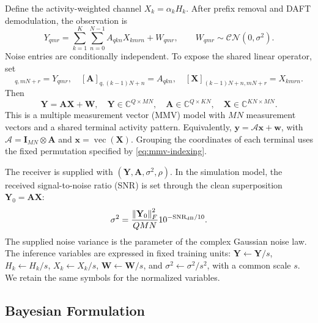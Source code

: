 \documentclass[10pt,a4paper]{article}
\newcommand{\CN}{\mathcal{CN}}
\newcommand{\I}{\mathbf{I}}
\newcommand{\vect}{\operatorname{vec}}
\newcommand{\norm}[1]{\left\lVert#1\right\rVert}
\begin{document}
Define the activity-weighted channel $X_k=\alpha_kH_k$. After prefix
removal and DAFT demodulation, the observation is
\begin{equation}
 Y_{qmr}=\sum_{k=1}^{K}\sum_{n=0}^{N-1}A_{qkn}X_{kmrn}+W_{qmr},
 \qquad W_{qmr}\sim\CN(0,\sigma^2).
 \label{eq:observation-tensor}
\end{equation}
Noise entries are conditionally independent. To expose the shared linear
operator, set
\begin{equation}
 [\mathbf{Y}]_{q,mN+r}=Y_{qmr},\quad
 [\mathbf{A}]_{q,(k-1)N+n}=A_{qkn},\quad
 [\mathbf{X}]_{(k-1)N+n,mN+r}=X_{kmrn}.
 \label{eq:mmv-indexing}
\end{equation}
Then
\begin{equation}
 \mathbf{Y}=\mathbf{A}\mathbf{X}+\mathbf{W},\quad
 \mathbf{Y}\in\mathbb{C}^{Q\times MN},\quad
 \mathbf{A}\in\mathbb{C}^{Q\times KN},\quad
 \mathbf{X}\in\mathbb{C}^{KN\times MN}.
 \label{eq:mmv}
\end{equation}
This is a multiple measurement vector (MMV) model with $MN$ measurement
vectors and a shared terminal activity pattern. Equivalently,
$\mathbf{y}=\mathcal{A}\mathbf{x}+\mathbf{w}$, with
$\mathcal{A}=\I_{MN}\otimes\mathbf{A}$ and
$\mathbf{x}=\vect(\mathbf{X})$. Grouping the coordinates of each terminal
uses the fixed permutation specified by \eqref{eq:mmv-indexing}.

The receiver is supplied with $(\mathbf{Y},\mathbf{A},\sigma^2,\rho)$.
In the simulation model, the received signal-to-noise ratio (SNR) is set
through the clean superposition $\mathbf{Y}_0=\mathbf{A}\mathbf{X}$:
\begin{equation}
 \sigma^2=\frac{\norm{\mathbf{Y}_0}_F^2}{QMN}
                     10^{-\mathrm{SNR}_{\rm dB}/10}.
 \label{eq:snr}
\end{equation}
The supplied noise variance is the parameter of the complex Gaussian
noise law. The inference variables are expressed in fixed training units:
$\mathbf{Y}\leftarrow\mathbf{Y}/s$,
$H_k\leftarrow H_k/s$, $X_k\leftarrow X_k/s$,
$\mathbf{W}\leftarrow\mathbf{W}/s$, and $\sigma^2\leftarrow\sigma^2/s^2$, with a
common scale $s$. We retain the same symbols for the normalized variables.

\subsection{Bayesian Formulation}
\end{document}
